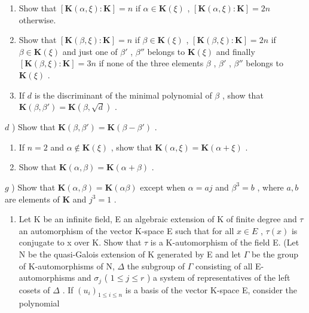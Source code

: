 \begin{enumerate}
\def\labelenumi{\alph{enumi})}
\item
  Show that \([\mathbf{K}(\alpha, \xi): \mathbf{K}] = n\) if \(\alpha \in \mathbf{K}(\xi)\) , \([\mathbf{K}(\alpha, \xi): \mathbf{K}] = 2n\) otherwise.
\item
  Show that \([\mathbf{K}(\beta,\xi):\mathbf{K}]=n\) if \(\beta\in\mathbf{K}(\xi)\) , \([\mathbf{K}(\beta,\xi):\mathbf{K}]=2n\) if \(\beta\in\mathbf{K}(\xi)\) and just one of \(\beta'\) , \(\beta''\) belongs to \(\mathbf{K}(\xi)\) and finally \([\mathbf{K}(\beta,\xi):\mathbf{K}]=3n\) if none of the three elements \(\beta\) , \(\beta'\) , \(\beta''\) belongs to \(\mathbf{K}(\xi)\) .
\item
  If \(d\) is the discriminant of the minimal polynomial of \(\beta\) , show that \(\mathbf{K}(\beta, \beta') = \mathbf{K}(\beta, \sqrt{d})\) .
\end{enumerate}

\(d\) ) Show that \(\mathbf{K}(\beta, \beta') = \mathbf{K}(\beta - \beta')\) .

\begin{enumerate}
\def\labelenumi{\alph{enumi})}
\setcounter{enumi}{4}
\item
  If \(n = 2\) and \(\alpha \notin \mathbf{K}(\xi)\) , show that \(\mathbf{K}(\alpha, \xi) = \mathbf{K}(\alpha + \xi)\) .
\item
  Show that \(\mathbf{K}(\alpha, \beta) = \mathbf{K}(\alpha + \beta)\) .
\end{enumerate}

\(g\) ) Show that \(\mathbf{K}(\alpha ,\beta) = \mathbf{K}(\alpha \beta)\) except when \(\alpha = aj\) and \(\beta^3 = b\) , where \(a,b\) are elements of \(\mathbf{K}\) and \(j^3 = 1\) .

\begin{enumerate}
\def\labelenumi{\arabic{enumi})}
\setcounter{enumi}{7}
\tightlist
\item
  Let K be an infinite field, E an algebraic extension of K of finite degree and \(\tau\) an automorphism of the vector K-space E such that for all \(x \in E\) , \(\tau(x)\) is conjugate to x over K. Show that \(\tau\) is a K-automorphism of the field E. (Let N be the quasi-Galois extension of K generated by E and let \(\Gamma\) be the group of K-automorphisms of N, \(\Delta\) the subgroup of \(\Gamma\) consisting of all E-automorphisms and \(\sigma_{j}\) ( \(1 \leqslant j \leqslant r\) ) a system of representatives of the left cosets of \(\Delta\) . If \((u_{i})_{1 \leqslant i \leqslant n}\) is a basis of the vector K-space E, consider the polynomial
\end{enumerate}

